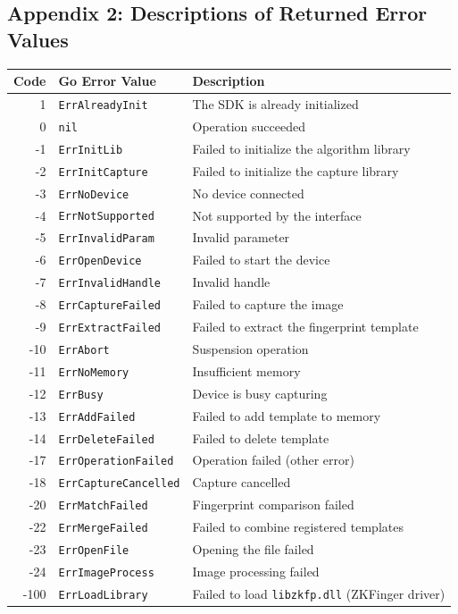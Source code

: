 \documentclass[11pt, a4paper]{article}
\begin{document}
\subsection{Appendix 2: Descriptions of Returned Error Values}
\begin{table}[htbp]
\centering
\begin{tabularx}{\textwidth}{r l X}
\toprule
\textbf{Code} & \textbf{Go Error Value} & \textbf{Description} \\
\midrule
1 & \texttt{ErrAlreadyInit} & The SDK is already initialized \\
0 & \texttt{nil} & Operation succeeded \\
-1 & \texttt{ErrInitLib} & Failed to initialize the algorithm library \\
-2 & \texttt{ErrInitCapture} & Failed to initialize the capture library \\
-3 & \texttt{ErrNoDevice} & No device connected \\
-4 & \texttt{ErrNotSupported} & Not supported by the interface \\
-5 & \texttt{ErrInvalidParam} & Invalid parameter \\
-6 & \texttt{ErrOpenDevice} & Failed to start the device \\
-7 & \texttt{ErrInvalidHandle} & Invalid handle \\
-8 & \texttt{ErrCaptureFailed} & Failed to capture the image \\
-9 & \texttt{ErrExtractFailed} & Failed to extract the fingerprint template \\
-10 & \texttt{ErrAbort} & Suspension operation \\
-11 & \texttt{ErrNoMemory} & Insufficient memory \\
-12 & \texttt{ErrBusy} & Device is busy capturing \\
-13 & \texttt{ErrAddFailed} & Failed to add template to memory \\
-14 & \texttt{ErrDeleteFailed} & Failed to delete template \\
-17 & \texttt{ErrOperationFailed} & Operation failed (other error) \\
-18 & \texttt{ErrCaptureCancelled} & Capture cancelled \\
-20 & \texttt{ErrMatchFailed} & Fingerprint comparison failed \\
-22 & \texttt{ErrMergeFailed} & Failed to combine registered templates \\
-23 & \texttt{ErrOpenFile} & Opening the file failed \\
-24 & \texttt{ErrImageProcess} & Image processing failed \\
-100 & \texttt{ErrLoadLibrary} & Failed to load \texttt{libzkfp.dll} (ZKFinger driver) \\
\bottomrule
\end{tabularx}
\end{table}
\end{document}
